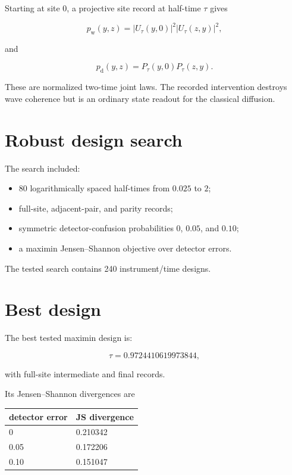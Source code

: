 \documentclass[11pt,a4paper,openany]{report}
\begin{document}
Starting at site \(0\), a projective site record at half-time \(\tau\) gives

\[
p_{\mathrm w}(y,z)
=
|U_\tau(y,0)|^2
|U_\tau(z,y)|^2,
\]

and

\[
p_{\mathrm d}(y,z)
=
P_\tau(y,0)
P_\tau(z,y).
\]

These are normalized two-time joint laws. The recorded intervention destroys wave coherence but is an ordinary state readout for the classical diffusion.

\section{Robust design search}

The search included:

\begin{itemize}
\item 
80 logarithmically spaced half-times from \(0.025\) to \(2\);

\item 
full-site, adjacent-pair, and parity records;

\item 
symmetric detector-confusion probabilities \(0\), \(0.05\), and \(0.10\);

\item 
a maximin Jensen--Shannon objective over detector errors.

\end{itemize}

The tested search contains 240 instrument/\allowbreak{}time designs.

\section{Best design}

The best tested maximin design is:

\[
\tau=0.9724410619973844,
\]

with full-site intermediate and final records.

Its Jensen--Shannon divergences are

\begin{center}
\begingroup\small
\setlength{\tabcolsep}{3.5pt}
\renewcommand{\arraystretch}{1.16}
\begin{longtable}{@{}p{}p{}@{}}
\toprule
\textbf{detector error} & \textbf{JS divergence} \\
\midrule
\endhead
0 & 0.210342 \\
0.05 & 0.172206 \\
0.10 & 0.151047 \\
\bottomrule
\end{longtable}
\endgroup
\end{center}
\end{document}
